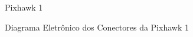 %
\begin{figure}[H]
	\centering
	\caption{Pixhawk 1}
	\fontsize{9pt}{12pt}\selectfont
	\def\svgwidth{11cm}
	
	\label{fig:pixhawk}
\end{figure}

%
\begin{figure}[H]
	\centering
	\caption{Diagrama Eletrônico dos Conectores da Pixhawk 1}
	\fontsize{9pt}{12pt}\selectfont
	\def\svgwidth{13cm}
	
	\label{fig:pixhawkCirc}
\end{figure}

